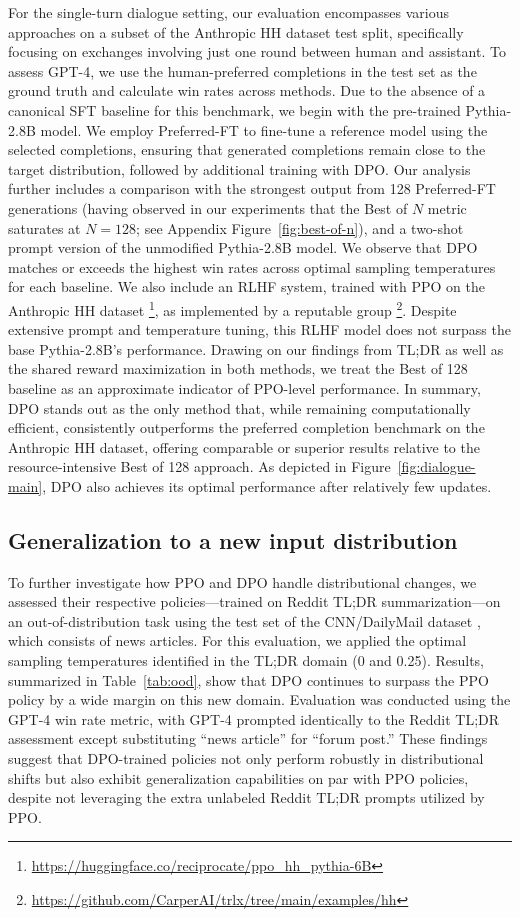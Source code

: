For the single-turn dialogue setting, our evaluation encompasses various approaches on a subset of the Anthropic HH dataset \citep{bai2022training} test split, specifically focusing on exchanges involving just one round between human and assistant. To assess GPT-4, we use the human-preferred completions in the test set as the ground truth and calculate win rates across methods. Due to the absence of a canonical SFT baseline for this benchmark, we begin with the pre-trained Pythia-2.8B model. We employ Preferred-FT to fine-tune a reference model using the selected completions, ensuring that generated completions remain close to the target distribution, followed by additional training with DPO. Our analysis further includes a comparison with the strongest output from 128 Preferred-FT generations (having observed in our experiments that the Best of $N$ metric saturates at $N=128$; see Appendix Figure~\ref{fig:best-of-n}), and a two-shot prompt version of the unmodified Pythia-2.8B model. We observe that DPO matches or exceeds the highest win rates across optimal sampling temperatures for each baseline. We also include an RLHF system, trained with PPO on the Anthropic HH dataset \footnote{\url{https://huggingface.co/reciprocate/ppo_hh_pythia-6B}}, as implemented by a reputable group \footnote{\url{https://github.com/CarperAI/trlx/tree/main/examples/hh}}. Despite extensive prompt and temperature tuning, this RLHF model does not surpass the base Pythia-2.8B's performance. Drawing on our findings from TL;DR as well as the shared reward maximization in both methods, we treat the Best of 128 baseline as an approximate indicator of PPO-level performance. In summary, DPO stands out as the only method that, while remaining computationally efficient, consistently outperforms the preferred completion benchmark on the Anthropic HH dataset, offering comparable or superior results relative to the resource-intensive Best of 128 approach. As depicted in Figure~\ref{fig:dialogue-main}, DPO also achieves its optimal performance after relatively few updates.

\subsection{Generalization to a new input distribution}

To further investigate how PPO and DPO handle distributional changes, we assessed their respective policies—trained on Reddit TL;DR summarization—on an out-of-distribution task using the test set of the CNN/DailyMail dataset \citep{nallapati-etal-2016-abstractive}, which consists of news articles. For this evaluation, we applied the optimal sampling temperatures identified in the TL;DR domain (0 and 0.25). Results, summarized in Table~\ref{tab:ood}, show that DPO continues to surpass the PPO policy by a wide margin on this new domain. Evaluation was conducted using the GPT-4 win rate metric, with GPT-4 prompted identically to the Reddit TL;DR assessment except substituting “news article” for “forum post.” These findings suggest that DPO-trained policies not only perform robustly in distributional shifts but also exhibit generalization capabilities on par with PPO policies, despite not leveraging the extra unlabeled Reddit TL;DR prompts utilized by PPO.


